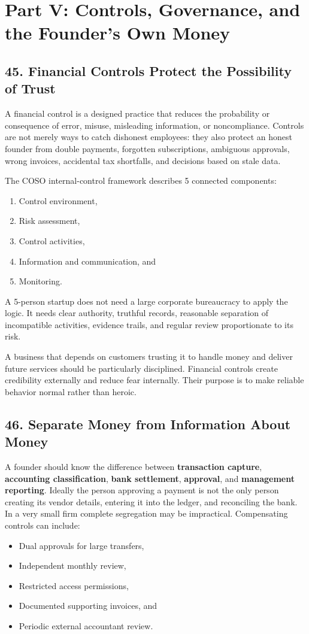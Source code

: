 \section*{Part V: Controls, Governance, and the Founder's Own Money}

\subsection*{45. Financial Controls Protect the Possibility of Trust}

A financial control is a designed practice that reduces the probability or consequence of error, misuse, misleading information, or noncompliance. Controls are not merely ways to catch dishonest employees: they also protect an honest founder from double payments, forgotten subscriptions, ambiguous approvals, wrong invoices, accidental tax shortfalls, and decisions based on stale data.

The COSO internal-control framework describes 5 connected components:
\begin{enumerate}
\item Control environment,
\item Risk assessment,
\item Control activities,
\item Information and communication, and
\item Monitoring.
\end{enumerate}
A 5-person startup does not need a large corporate bureaucracy to apply the logic. It needs clear authority, truthful records, reasonable separation of incompatible activities, evidence trails, and regular review proportionate to its risk.

A business that depends on customers trusting it to handle money and deliver future services should be particularly disciplined. Financial controls create credibility externally and reduce fear internally. Their purpose is to make reliable behavior normal rather than heroic.

\subsection*{46. Separate Money from Information About Money}

A founder should know the difference between \textbf{transaction capture}, \textbf{accounting classification}, \textbf{bank settlement}, \textbf{approval}, and \textbf{management reporting}. Ideally the person approving a payment is not the only person creating its vendor details, entering it into the ledger, and reconciling the bank. In a very small firm complete segregation may be impractical. Compensating controls can include:
\begin{itemize}
\item Dual approvals for large transfers,
\item Independent monthly review,
\item Restricted access permissions,
\item Documented supporting invoices, and
\item Periodic external accountant review.
\end{itemize}

